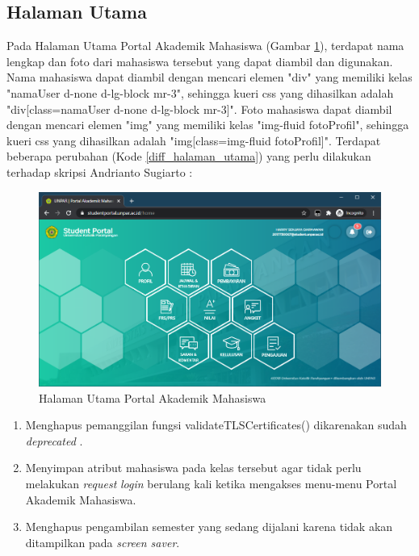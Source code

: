 \subsection{Halaman Utama}
Pada Halaman Utama Portal Akademik Mahasiswa (Gambar \ref{fig:3_home}), terdapat nama lengkap dan foto dari mahasiswa tersebut yang dapat diambil dan digunakan. Nama mahasiswa dapat diambil dengan mencari elemen "div" yang memiliki kelas "namaUser d-none d-lg-block mr-3", sehingga kueri css yang dihasilkan adalah "div[class=namaUser d-none d-lg-block mr-3]". Foto mahasiswa dapat diambil dengan mencari elemen "img" yang memiliki kelas "img-fluid fotoProfil", sehingga kueri css yang dihasilkan adalah "img[class=img-fluid fotoProfil]".
Terdapat beberapa perubahan (Kode \ref{diff_halaman_utama}) yang perlu dilakukan terhadap skripsi Andrianto Sugiarto \cite{ifstupor}:

\begin{figure}[H]
	\centering
	\includegraphics[scale=0.5]{Gambar/home.png}
	\caption{Halaman Utama Portal Akademik Mahasiswa} 
	\label{fig:3_home}
\end{figure}

\begin{enumerate}
    \item Menghapus pemanggilan fungsi validateTLSCertificates() dikarenakan sudah \textit{deprecated} \cite{jsoup}.
    \item Menyimpan atribut mahasiswa pada kelas tersebut agar tidak perlu melakukan \textit{request} \textit{login} berulang kali ketika mengakses menu-menu Portal Akademik Mahasiswa.
    \item Menghapus pengambilan semester yang sedang dijalani karena tidak akan ditampilkan pada \textit{screen saver}.
\end{enumerate}

